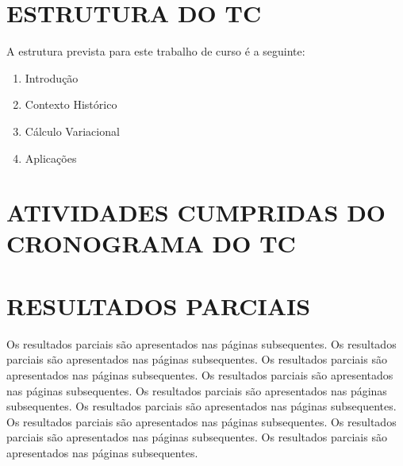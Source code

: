 \documentclass[
	12pt,				%
	openright,			%
    oneside,			%
	a4paper,			%
	english,			%
	french,				%
	spanish,			%
	brazil				%
	]{abntex2}
\numberwithin{lema}{chapter}
\numberwithin{teorema}{chapter}
\numberwithin{definicao}{chapter}
\numberwithin{figure}{chapter}
\begin{document}

\frenchspacing 

\pretextual
{
	\imprimircapa
	\clearpage
}
%
%
\pagestyle{ueg_mat_heading}
{
	\section*{ESTRUTURA DO TC}

	A estrutura prevista para este trabalho de curso é a seguinte:
	
	\begin{enumerate}[align=left,leftmargin=*,label=\textbf{Capítulo \arabic*}:]
		\item Introdução
		\item Contexto Histórico
		\item Cálculo Variacional
		\item Aplicações
		\estruturaReferencias
	\end{enumerate}

	\section*{ATIVIDADES CUMPRIDAS DO CRONOGRAMA DO TC}

	
	
	\section*{RESULTADOS PARCIAIS}
	
	Os resultados parciais são apresentados nas páginas subsequentes.
	Os resultados parciais são apresentados nas páginas subsequentes.
	Os resultados parciais são apresentados nas páginas subsequentes.
	Os resultados parciais são apresentados nas páginas subsequentes.
	Os resultados parciais são apresentados nas páginas subsequentes.
	Os resultados parciais são apresentados nas páginas subsequentes.
	Os resultados parciais são apresentados nas páginas subsequentes.
	Os resultados parciais são apresentados nas páginas subsequentes.
	Os resultados parciais são apresentados nas páginas subsequentes.
	
}
\clearpage
\end{document}

